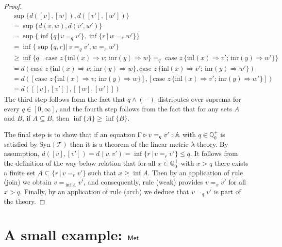 \begin{proof}
  \begin{align*}
    & \sup{\{d([v],[w]),d([v'],[w']) \}}  \\
    & = \sup{\{d(v,w),d(v',w') \}} \\
    & = \sup {\{ \inf{\{q \, \vert \, v=_q v'\}},\inf{\{r \, \vert \, w=_r w'\}}  \}} \\
    & = \inf{\{ \sup \{ q, r \} \vert \, v=_q v', w=_r w' \}} &  \\
    & \geq  \inf{ \{ q  \,\vert \, \text{ case } z \,   \{\text{inl} (x) \Rightarrow v ; \, \text{inr} (y) \Rightarrow w\} =_{q} \text{ case } z \,  \{\text{inl} (x) \Rightarrow v' ; \,\text{inr} (y) \Rightarrow w'\} \} } &  \\ 
    & = d(\text{case } z \,   \{\text{inl} (x) \Rightarrow v ; \, \text{inr} (y) \Rightarrow w\}, \text{case } z \,  \{\text{inl} (x) \Rightarrow v' ; \,\text{inr} (y) \Rightarrow w'\}) \\
    & = d([\text{case } z \,   \{\text{inl} (x) \Rightarrow v ; \, \text{inr} (y) \Rightarrow w\}], [\text{case } z \,  \{\text{inl} (x) \Rightarrow v' ; \,\text{inr} (y) \Rightarrow w'\}]) \\
    & = d([[v],[v']],[[w],[w']])  
  \end{align*}
   The third step follows form the fact that $q \wedge (-)$
  distributes over suprema for every $q \in [0, \infty]$, and the fourth step follows from the fact that for any sets $A$ and $B$, if $A \subseteq B$, then $\inf\{A\} \geq \inf\{B\}$.

  The final step is to show that if an equation $\Gamma \triangleright v =_q v' : \mathbb{A}$ with $q \in \mathbb{Q}^{+}_0$ is satisfied by Syn$(\mathscr{T})$ then it is a theorem of the linear metric $\lambda$-theory. By assumption, $d([v],[v']) = d(v,v') =  \inf{ \{r \, \vert \, v =_r v'\}} \leq q$. It follows from the definition of the way-below relation that for all
 $x \in \mathbb{Q}^{+}_0$ with $x>q$ there exists a finite set $A \subseteq \{r \, \vert \, v =_r v'\}$ such that $x \geq \inf{A}$. Then by an
 application of rule (join) we obtain $v =_{\inf{A}} v'$, and consequently, rule (weak) provides $v =_x v'$ for all $x > q$. Finally, by an application of rule (arch)  we deduce that $v =_q v'$ is part of the theory.
\end{proof}

\section{A small example: $\mathsf{Met}$}

